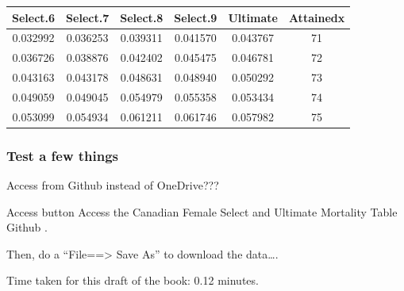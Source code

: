 \documentclass[
]{book}
\begin{document}
\begin{tabular}{c|c|c|c|c|c}
\hline
Select.6 & Select.7 & Select.8 & Select.9 & Ultimate & Attainedx\\
\hline
0.032992 & 0.036253 & 0.039311 & 0.041570 & 0.043767 & 71\\
\hline
0.036726 & 0.038876 & 0.042402 & 0.045475 & 0.046781 & 72\\
\hline
0.043163 & 0.043178 & 0.048631 & 0.048940 & 0.050292 & 73\\
\hline
0.049059 & 0.049045 & 0.054979 & 0.055358 & 0.053434 & 74\\
\hline
0.053099 & 0.054934 & 0.061211 & 0.061746 & 0.057982 & 75\\
\hline
\end{tabular}

\hypertarget{test-a-few-things}{%
\subsubsection*{Test a few things}\label{test-a-few-things}}

Access from Github instead of OneDrive???

Access button
Access the Canadian Female Select and Ultimate Mortality Table Github .

Then, do a ``File==\textgreater{} Save As'' to download the data\ldots.

Time taken for this draft of the book: 0.12 minutes.

  
\end{document}
